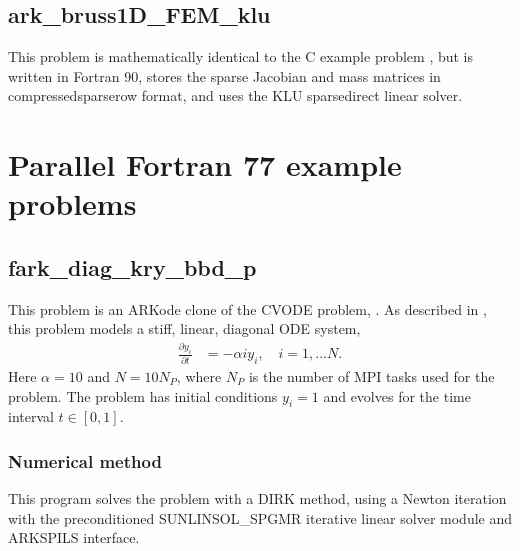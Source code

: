 \documentclass[letterpaper,10pt,english]{sphinxmanual}
\begin{document}
\begin{figure}[htbp]
\centering

\noindent{}
\end{figure}


\section{ark\_bruss1D\_FEM\_klu}
\label{\detokenize{f2003_serial:ark-bruss1d-fem-klu}}\label{\detokenize{f2003_serial:id8}}
\sphinxAtStartPar
This problem is mathematically identical to the C example problem
{\hyperref[\detokenize{c_serial:ark-brusselator1d-fem-slu}]{}}, but is written in Fortran 90, stores
the sparse Jacobian and mass matrices in compressed\sphinxhyphen{}sparse\sphinxhyphen{}row format,
and uses the KLU sparse\sphinxhyphen{}direct linear solver.

\sphinxstepscope


\chapter{Parallel Fortran 77 example problems}
\label{\detokenize{f77_parallel:parallel-fortran-77-example-problems}}\label{\detokenize{f77_parallel:parallel-f77}}\label{\detokenize{f77_parallel::doc}}

\section{fark\_diag\_kry\_bbd\_p}
\label{\detokenize{f77_parallel:fark-diag-kry-bbd-p}}\label{\detokenize{f77_parallel:id1}}
\sphinxAtStartPar
This problem is an ARKode clone of the CVODE problem,
.  As described in , this problem
models a stiff, linear, diagonal ODE system,
\begin{equation*}
\begin{split}\frac{\partial y_i}{\partial t} &= -\alpha i y_i, \quad i=1,\ldots N.\end{split}
\end{equation*}
\sphinxAtStartPar
Here \(\alpha=10\) and \(N=10 N_P\), where \(N_P\) is the
number of MPI tasks used for the problem.  The problem has initial
conditions \(y_i=1\) and evolves for the time interval \(t\in
[0,1]\).


\subsection{Numerical method}
\label{\detokenize{f77_parallel:numerical-method}}
\sphinxAtStartPar
This program solves the problem with a DIRK method, using a Newton
iteration with the preconditioned SUNLINSOL\_SPGMR iterative linear
solver module and ARKSPILS interface.
\end{document}
